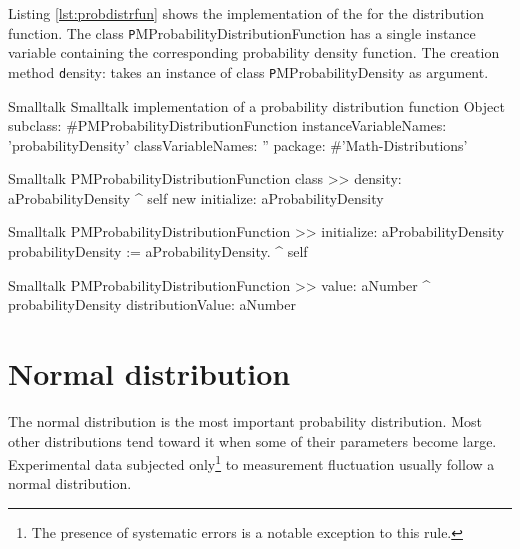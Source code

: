Listing \ref{lst:probdistrfun} shows the implementation of the  for the distribution function. The class {\texttt PMProbabilityDistributionFunction} has a single instance variable containing the corresponding probability density function.
The creation method {\texttt density:} takes an instance of class {\texttt PMProbabilityDensity} as argument.

%
\begin{listing}[label=lst:probdistrfun]{Smalltalk}
{Smalltalk implementation of a probability distribution function}
Object subclass: #PMProbabilityDistributionFunction
   instanceVariableNames: 'probabilityDensity'
    classVariableNames: ''
    package: #'Math-Distributions'
\end{listing}

\begin{displaycode}{Smalltalk}
PMProbabilityDistributionFunction class >> density: aProbabilityDensity
    ^ self new initialize: aProbabilityDensity
\end{displaycode}

\begin{displaycode}{Smalltalk}
PMProbabilityDistributionFunction >> initialize: aProbabilityDensity
    probabilityDensity := aProbabilityDensity.
    ^ self
\end{displaycode}

\begin{displaycode}{Smalltalk}
PMProbabilityDistributionFunction >> value: aNumber
    ^ probabilityDensity distributionValue: aNumber
\end{displaycode}

\section{Normal distribution}
\label{sec:normdist} The normal distribution is the most important
probability distribution. Most other distributions tend toward it
when some of their parameters become large. Experimental data
subjected only\footnote{The presence of systematic errors is a
notable exception to this rule.} to measurement fluctuation
usually follow a normal distribution.

